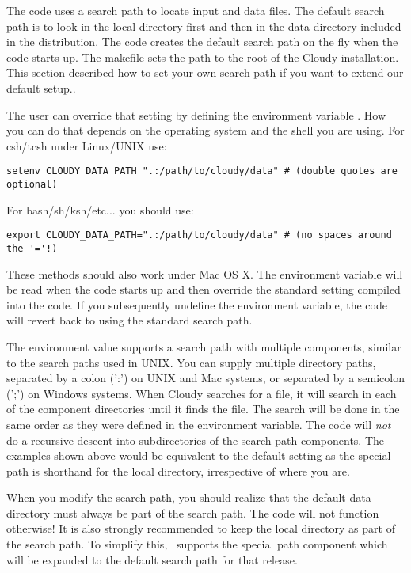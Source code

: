 The code uses a search path to locate input and data files. 
The default search path is to look in the local directory
first and then in the data directory included in the distribution. 
The code creates the default search path on the fly when the code starts up. 
The makefile sets the path to the root of the Cloudy installation. 
This section described how to set your own search path if you want to extend
our default setup..

The user
can override that setting by defining the environment variable
. How you can do that depends on the operating
system and the shell you are using. For csh/tcsh under Linux/UNIX use:
\begin{verbatim}
setenv CLOUDY_DATA_PATH ".:/path/to/cloudy/data" # (double quotes are optional)
\end{verbatim}
For bash/sh/ksh/etc... you should use:
\begin{verbatim}
export CLOUDY_DATA_PATH=".:/path/to/cloudy/data" # (no spaces around the '='!)
\end{verbatim}
These methods should also work under Mac OS X. The environment variable will
be read when the code starts up and then override the standard setting
compiled into the code. If you subsequently undefine the environment variable,
the code will revert back to using the standard search path.

The environment value  supports a search path
with multiple components, similar to the search paths used in UNIX. You can
supply multiple directory paths, separated by a colon (':') on UNIX and Mac
systems, or separated by a semicolon (';') on Windows systems. When Cloudy
searches for a file, it will search in each of the component directories until
it finds the file. The search will be done in the same order as they were
defined in the environment variable. The code will {\em not} do a recursive
descent into subdirectories of the search path components. The examples shown
above would be equivalent to the default setting as the special path
 is shorthand for the local directory, irrespective of where
you are.

When you modify the search path, you should realize that the default data
directory must always be part of the search path. The code will not function
otherwise! It is also strongly recommended to keep the local directory as part
of the search path. To simplify this, \Cloudy\ supports the special path
component  which will be expanded to the default search path
for that release.

